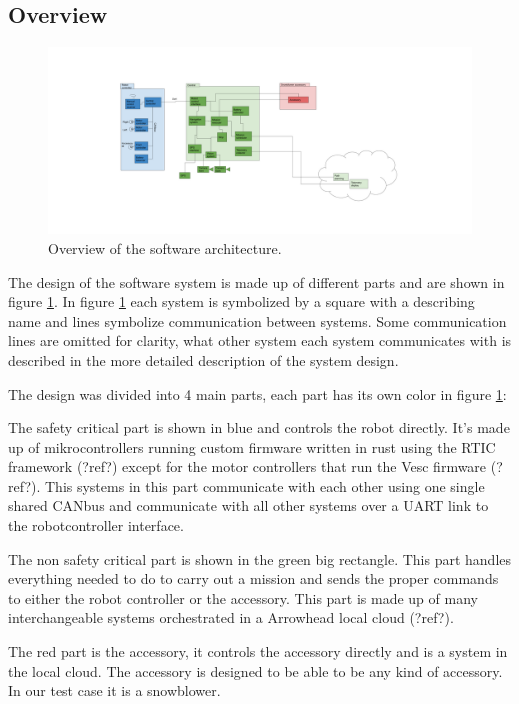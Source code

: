 \documentclass[main.tex]{subfiles}
\begin{document}
\subsection{Overview}
\label{sec:sw_design_overview}

\begin{figure}[H]
    \includegraphics[width=\textwidth]{software_overview.png}
    \caption{Overview of the software architecture.}
    \label{fig:software_overview}
\end{figure}

The design of the software system is made up of different parts and are shown in figure \ref{fig:software_overview}. 
In figure \ref{fig:software_overview} each system is symbolized by a square with a describing name and
lines symbolize communication between systems. Some communication lines are omitted for clarity, what other system each system communicates with is described in the more detailed description of the system design.

The design was divided into 4 main parts, each part has its own color in figure \ref{fig:software_overview}:

The safety critical part is shown in blue and controls the robot directly. 
It's made up of mikrocontrollers running custom firmware written in rust using the RTIC framework (?ref?) except
for the motor controllers that run the Vesc firmware (?ref?).
This systems in this part communicate with each other using one single shared CANbus and communicate with all other systems over a UART link to the robotcontroller interface.

The non safety critical part is shown in the green big rectangle.
This part handles everything needed to do to carry out a mission and sends the proper commands to either the robot controller or the accessory. This part is made up of many interchangeable systems orchestrated in a Arrowhead local cloud (?ref?).

The red part is the accessory, it controls the accessory directly and is a system in the local cloud.
The accessory is designed to be able to be any kind of accessory. In our test case it is a snowblower.
\end{document}
